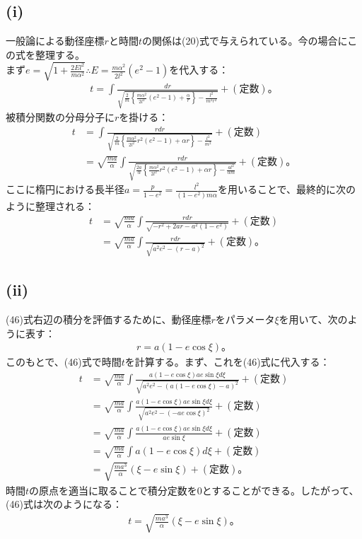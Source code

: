   \subsection*{(i)}
  一般論による動径座標$r$と時間$t$の関係は(20)式で与えられている。今の場合にこの式を整理する。\\
  まず$e=\sqrt{1+\frac{2El^2}{m\alpha^2}}\therefore E=\frac{m\alpha^2}{2l^2}(e^2-1)$を代入する：
  \begin{align*}
    t=\int \frac{dr}{\sqrt{\frac{2}{m} \left\{\frac{m\alpha^2}{2l^2}(e^2-1)+\frac{\alpha}{r}\right\}-\frac{l^2}{m^2r^2}}}+(定数)。
  \end{align*}
  被積分関数の分母分子に$r$を掛ける：
  \begin{align*}
    t&=\int \frac{rdr}{\sqrt{\frac{2}{m} \left\{\frac{m\alpha^2}{2l^2}r^2(e^2-1)+\alpha r\right\}-\frac{l^2}{m^2}}}+(定数)\\
    &=\sqrt{\frac{ma}{\alpha}}\int \frac{rdr}{\sqrt{\frac{2a}{\alpha}\left\{\frac{m\alpha^2}{2l^2}r^2(e^2-1)+\alpha r\right\}-\frac{al^2}{\alpha m}}}+(定数)。
  \end{align*}
  ここに楕円における長半径$a=\frac{p}{1-e^2}=\frac{l^2}{(1-e^2)m\alpha}$を用いることで、最終的に次のように整理される：
  \begin{align*}
    t&=\sqrt{\frac{ma}{\alpha}}\int \frac{rdr}{\sqrt{-r^2+2ar-a^2(1-e^2)}}+(定数)\\
    &=\sqrt{\frac{ma}{\alpha}}\int \frac{rdr}{\sqrt{a^2e^2-(r-a)^2}}+(定数)。\tag{46}
  \end{align*}

  \subsection*{(ii)}
  (46)式右辺の積分を評価するために、動径座標$r$をパラメータ$\xi$を用いて、次のように表す：
  \begin{align*}
    r=a(1-e\cos\xi)。\tag{47}
  \end{align*}
  このもとで、(46)式で時間$t$を計算する。まず、これを(46)式に代入する：
  \begin{align*}
    t&=\sqrt{\frac{ma}{\alpha}}\int \frac{a(1-e\cos\xi)ae\sin\xi d\xi}{\sqrt{a^2e^2-(a(1-e\cos\xi)-a)^2}}+(定数)\\
    &=\sqrt{\frac{ma}{\alpha}}\int \frac{a(1-e\cos\xi)ae\sin\xi d\xi}{\sqrt{a^2e^2-(-ae\cos\xi)^2 }}+(定数)\\
    &=\sqrt{\frac{ma}{\alpha}}\int \frac{a(1-e\cos\xi)ae\sin\xi d\xi}{ae\sin\xi}+(定数)\\
    &=\sqrt{\frac{ma}{\alpha}}\int a(1-e\cos\xi)d\xi+(定数)\\
    &=\sqrt{\frac{ma^3}{\alpha}}\left(\xi-e\sin\xi\right)+(定数)。
  \end{align*}
  時間$t$の原点を適当に取ることで積分定数を0とすることができる。したがって、(46)式は次のようになる：
  \begin{align*}
    t=\sqrt{\frac{ma^3}{\alpha}}\left(\xi-e\sin\xi\right)。\tag{48}
  \end{align*}

